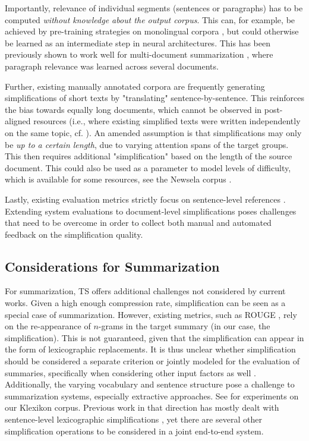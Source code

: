 \documentclass[10pt, a4paper]{article}
\begin{document}
Importantly, relevance of individual segments (sentences or paragraphs) has to be computed \emph{without knowledge about the output corpus}.
This can, for example, be achieved by pre-training strategies on monolingual corpora \cite{mallinson-etal-2020-zero}, but could otherwise be learned as an intermediate step in neural architectures.
This has been previously shown to work well for multi-document summarization \cite{liu-lapata-2019-hierarchical}, where paragraph relevance was learned across several documents.

Further, existing manually annotated corpora are frequently generating simplifications of short texts by "translating" sentence-by-sentence. This reinforces the bias towards equally long documents, which cannot be observed in post-aligned resources (i.e., where existing simplified texts were written independently on the same topic, cf. ).
An amended assumption is that simplifications may only be \emph{up to a certain length}, due to varying attention spans of the target groups. This then requires additional "simplification" based on the length of the source document.
This could also be used as a parameter to model levels of difficulty, which is available for some resources, see the Newsela corpus \cite{xu-etal-2015-problems}.

Lastly, existing evaluation metrics strictly focus on sentence-level references \cite{xu-etal-2016-optimizing}. Extending system evaluations to document-level simplifications poses challenges that need to be overcome in order to collect both manual and automated feedback on the simplification quality.




\subsection{Considerations for Summarization}
For summarization, TS offers additional challenges not considered by current works.
Given a high enough compression rate, simplification can be seen as a special case of summarization. However, existing metrics, such as  ROUGE \cite{lin-2004-rouge}, rely on the re-appearance of $n$-grams in the target summary (in our case, the simplification). This is not guaranteed, given that the simplification can appear in the form of lexicographic replacements. 
It is thus unclear whether simplification should be considered a separate criterion or jointly modeled for the evaluation of summaries, specifically when considering other input factors as well \cite{ter2020makes}.
Additionally, the varying vocabulary and sentence structure pose a challenge to summarization systems, especially extractive approaches. See  for experiments on our Klexikon corpus.
Previous work in that direction has mostly dealt with sentence-level lexicographic simplifications \cite{siddharthan-etal-2004-syntactic}, yet there are several other simplification operations to be considered \cite{amancio-specia-2014-analysis} in a joint end-to-end system.
\end{document}
